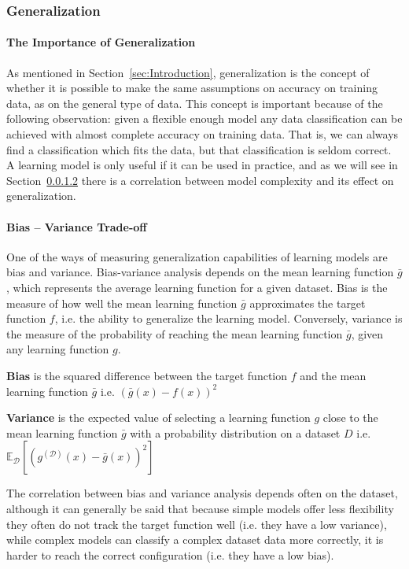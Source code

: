 \subsubsection{Generalization}
\label{ssub:Generalization}
\paragraph{The Importance of Generalization}
\label{par:TheImportanceofGeneralization}
As mentioned in Section~\ref{sec:Introduction}, generalization is the concept of whether it is possible to make the same assumptions on accuracy on training data,
as on the general type of data. This concept is important because of the following observation: given a flexible enough model any data classification can be achieved
with almost complete accuracy on training data. That is, we can always find a classification which fits the data, but that classification is seldom correct.
A learning model is only useful if it can be used in practice, and as we will see in Section~\ref{par:Bias-VarianceTrade-off} there is a correlation between model complexity
and its effect on generalization.
\paragraph{Bias -- Variance Trade-off}
\label{par:Bias-VarianceTrade-off}
One of the ways of measuring generalization capabilities of learning models are bias and variance. Bias-variance analysis depends on the mean learning function $\bar{g}$,
which represents the average learning function for a given dataset.
Bias is the measure of how well the mean learning function $\bar{g}$ approximates the target function $f$, i.e. the ability to generalize the learning model. Conversely,
variance is the measure of the probability of reaching the mean learning function $\bar{g}$, given any learning function $g$.
\begin{dfnt}
  \textbf{Bias} is the squared difference between the target function $f$ and the mean learning function $\bar{g}$ i.e. $\left(\bar{g}(x)-f(x)\right)^2$
\end{dfnt}
\begin{dfnt}
  \textbf{Variance} is the expected value of selecting a learning function $g$ close to the mean learning function $\bar{g}$ with a probability distribution on
  a dataset $D$ i.e. $\mathbb{E}_\mathcal{D}\left[(g^{(\mathcal{D})}(x)-\bar{g}(x))^2\right]$
\end{dfnt}

The correlation between bias and variance analysis depends often on the dataset,
although it can generally be said that because simple models offer less flexibility they often do not track the target function well (i.e. they have a low variance),
while complex models can classify a complex dataset data more correctly, it is harder to reach the correct configuration (i.e. they have a low bias).

